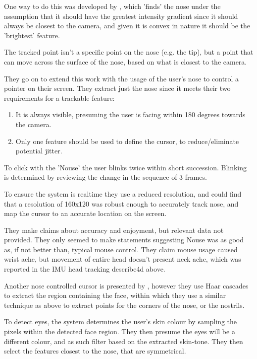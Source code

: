 One way to do this was developed by \citeauthor{gorodnichy2002importance}, which 'finds' the nose under the assumption that it should have the greatest intensity gradient since it should always be closest to the camera, and given it is convex in nature it should be the 'brightest' feature\cite{gorodnichy2002importance}.

The tracked point isn't a specific point on the nose (e.g. the tip), but a point that can move across the surface of the nose, based on what is closest to the camera.

They go on to extend this work with the usage of the user's nose to control a pointer on their screen\cite{gorodnichy2004nouse}. 
They extract just the nose since it meets their two requirements for a trackable feature: \begin{enumerate}
    \item It is always visible, presuming the user is facing within 180 degrees towards the camera.
    \item Only one feature should be used to define the cursor, to reduce/eliminate potential jitter.
\end{enumerate}

To click with the 'Nouse' the user blinks twice within short succession. Blinking is determined by reviewing the change in the sequence of 3 frames.

To ensure the system is realtime they use a reduced resolution, and could find that a resolution of 160x120 was robust enough to accurately track nose, and map the cursor to an accurate location on the screen.

They make claims about accuracy and enjoyment, but relevant data not provided. They only seemed to make statements suggesting Nouse was as good as, if not better than, typical mouse control.
They claim mouse usage caused wrist ache, but movement of entire head doesn't present neck ache, which was reported in the IMU head tracking describe4d above\cite{yan2018headgesture}.

Another nose controlled cursor is presented by \citeauthor{varona2008hands}, however they use Haar cascades to extract the region containing the face, within which they use a similar technique as above\cite{gorodnichy2002importance} to extract points for the corners of the nose, or the nostrils\cite{varona2008hands}.

To detect eyes, the system determines the user's skin colour by sampling the pixels within the detected face region. They then presume the eyes will be a different colour, and as such filter based on the extracted skin-tone. They then select the features closest to the nose, that are symmetrical.

